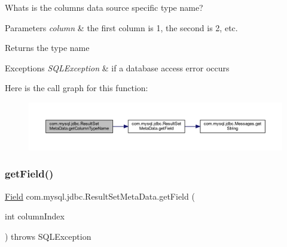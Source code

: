 Whats is the column\textquotesingle{}s data source specific type name?


\begin{DoxyParams}{Parameters}
{\em column} & the first column is 1, the second is 2, etc.\\
\hline
\end{DoxyParams}
\begin{DoxyReturn}{Returns}
the type name
\end{DoxyReturn}

\begin{DoxyExceptions}{Exceptions}
{\em S\+Q\+L\+Exception} & if a database access error occurs \\
\hline
\end{DoxyExceptions}
Here is the call graph for this function\+:
\nopagebreak
\begin{figure}[H]
\begin{center}
\leavevmode
\includegraphics[width=350pt]{classcom_1_1mysql_1_1jdbc_1_1_result_set_meta_data_a05b1032063c16ac751c62342fdaee172_cgraph}
\end{center}
\end{figure}
\mbox{\label{classcom_1_1mysql_1_1jdbc_1_1_result_set_meta_data_a5aa9a71bdb9452f61329796a7748988d}} 
\subsubsection{\texorpdfstring{get\+Field()}{getField()}}
{\footnotesize\ttfamily \mbox{\hyperlink{classcom_1_1mysql_1_1jdbc_1_1_field}{Field}} com.\+mysql.\+jdbc.\+Result\+Set\+Meta\+Data.\+get\+Field (\begin{DoxyParamCaption}\item[{int}]{column\+Index }\end{DoxyParamCaption}) throws S\+Q\+L\+Exception\hspace{0.3cm}{\ttfamily [protected]}}

